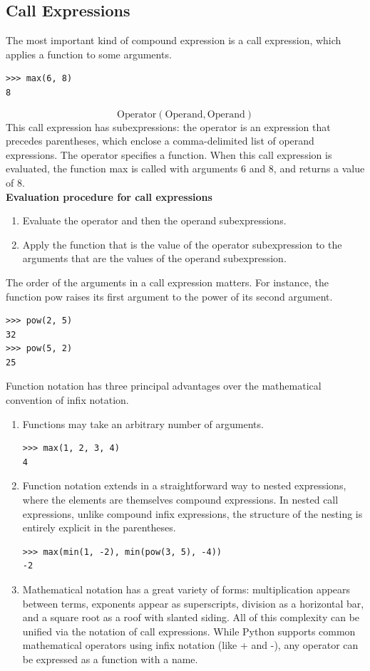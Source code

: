 \documentclass[11pt]{article}
\begin{document}
\subsection{Call Expressions}
The most important kind of compound expression is a call expression, which applies a function to some arguments. 
\begin{lstlisting}
>>> max(6, 8) 
8
\end{lstlisting}
$$\mbox{Operator}(\mbox{Operand}, \mbox{Operand})$$
This call expression has subexpressions: the operator is an expression that precedes parentheses, which enclose a comma-delimited list of operand expressions. The operator specifies a function. When this call expression is evaluated, the function max is called with arguments 6 and 8, and returns a value of 8. \\
\newline
\textbf{Evaluation procedure for call expressions}
\begin{enumerate}
\item Evaluate the operator and then the operand subexpressions. 
\item Apply the function that is the value of the operator subexpression to the arguments that are the values of the operand subexpression. 
\end{enumerate} 
The order of the arguments in a call expression matters. For instance, the function pow raises its first argument to the power of its second argument. 
\begin{lstlisting}
>>> pow(2, 5) 
32 
>>> pow(5, 2) 
25
\end{lstlisting}
Function notation has three principal advantages over the mathematical convention of infix notation. \\
\begin{enumerate} 
\item Functions may take an arbitrary number of arguments. 
\begin{lstlisting}
>>> max(1, 2, 3, 4)
4
\end{lstlisting} 
\item Function notation extends in a straightforward way to nested expressions, where the elements are themselves compound expressions. In nested call expressions, unlike compound infix expressions, the structure of the nesting is entirely explicit in the parentheses. 
\begin{lstlisting}
>>> max(min(1, -2), min(pow(3, 5), -4))
-2
\end{lstlisting}
\item Mathematical notation has a great variety of forms: multiplication appears between terms, exponents appear as superscripts, division as a horizontal bar, and a square root as a roof with slanted siding. All of this complexity can be unified via the notation of call expressions. While Python supports common mathematical operators using infix notation (like + and -), any operator can be expressed as a function with a name.
\end{enumerate}
\end{document}
